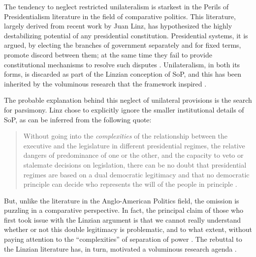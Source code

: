 The tendency to neglect restricted unilateralism is starkest in the Perils of Presidentialism literature in the field of comparative politics.  This literature, largely derived from recent work by Juan Linz, has hypothesized the highly destabilizing potential of any presidential constitution.  Presidential systems, it is argued, by electing the branches of government separately and for fixed terms, promote discord between them; at the same time they fail to provide constitutional mechanisms to resolve such disputes \citep{linz.1990,linz.valenzuela.1994}.  Unilateralism, in both its forms, is discarded as part of the Linzian conception of SoP, and this has been inherited by the voluminous research that the framework inspired \citep{linz.valenzuela.1994}.  

The probable explanation behind this neglect of unilateral provisions is the search for parsimony.  Linz chose to explicitly ignore the smaller institutional details of SoP, as can be inferred from the following quote:

\begin{quote}
Without going into the \emph{complexities} of the relationship between the executive and the legislature in different presidential regimes, the relative dangers of predominance of one or the other, and the capacity to veto or stalemate decisions on legislation, there can be no doubt that presidential regimes are based on a dual democratic legitimacy and that no democratic principle can decide who represents the will of the people in principle \citep[][7, emphasis added]{linz.1994}.
\end{quote}

But, unlike the literature in the Anglo-American Politics field, the omission is puzzling in a comparative perspective.  In fact, the principal claim of those who first took issue with the Linzian argument is that we cannot really understand whether or not this double legitimacy is problematic, and to what extent, without paying attention to the ``complexities'' of separation of power \citep{shugart.carey.1992}.  The rebuttal to the Linzian literature has, in turn, motivated a voluminous research agenda \citep{mainwaring.shugart.1997}.  


